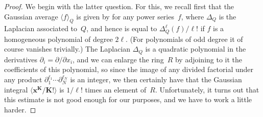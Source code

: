 \documentclass[11pt]{article}
\numberwithin{equation}{section}
\numberwithin{equation}{section}
\def\D{\Delta}
\def\pt{\partial}
\def\bK{\mathbf K}
\def\bx{\mathbf x}
\begin{document}
\begin{proof}
We begin with the latter question. For this, we recall first that the Gaussian
average $\langle f\rangle_Q$ is given by \smash{${\rm e}^{\D_Q}(f)\bigl|_{x=0}$} for any power
series~$f$, where $\D_Q$ is the Laplacian associated to~$Q$, and hence is equal to
$\D_Q^\ell(f)/\ell!$ if $f$ is a homogeneous polynomial of degree $2\ell$. (For
polynomials of odd degree it of course vanishes trivially.) The Laplacian $\D_Q$
is a quadratic polynomial in the derivatives $\pt_i=\pt/\pt x_i$, and we can enlarge
the ring~$R$ by adjoining to it the coefficients of this polynomial, so since the
image of any divided factorial under any product $\pt_1^{\ell_1}\cdots\pt_N^{\ell_N}$
is an integer, we then certainly have that the Gaussian integral
$\big\langle\bx^\bK/\bK! \big\rangle$ is $1/\ell!$ times an element of~$R$. Unfortunately,
it turns out that this estimate is not good enough for our purposes, and we have
to work a little harder.


\end{proof}
\end{document}
